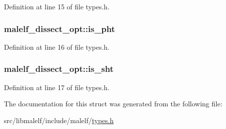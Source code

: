Definition at line 15 of file types.h.

\hypertarget{structmalelf__dissect__opt_a6d7284ba8a221d54022192ac572a8244}{
\subsubsection[{is\_\-pht}]{ {\bf malelf\_\-dissect\_\-opt::is\_\-pht}}}
\label{structmalelf__dissect__opt_a6d7284ba8a221d54022192ac572a8244}


Definition at line 16 of file types.h.

\hypertarget{structmalelf__dissect__opt_a9a8942b6b82bc1baac39701bc722f96d}{
\subsubsection[{is\_\-sht}]{ {\bf malelf\_\-dissect\_\-opt::is\_\-sht}}}
\label{structmalelf__dissect__opt_a9a8942b6b82bc1baac39701bc722f96d}


Definition at line 17 of file types.h.



The documentation for this struct was generated from the following file:\begin{DoxyCompactItemize}
\item 
src/libmalelf/include/malelf/\hyperlink{types_8h}{types.h}\end{DoxyCompactItemize}
